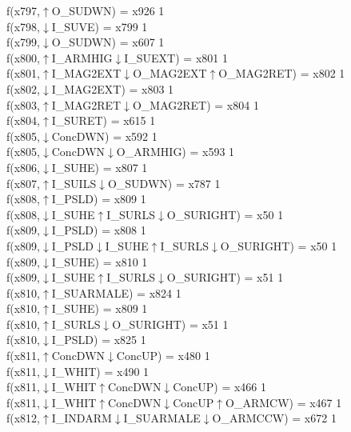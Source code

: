 f(x797,$\uparrow$O\_SUDWN) = x926 {1} \\
f(x798,$\downarrow$I\_SUVE) = x799 {1} \\
f(x799,$\downarrow$O\_SUDWN) = x607 {1} \\
f(x800,$\uparrow$I\_ARMHIG$\downarrow$I\_SUEXT) = x801 {1} \\
f(x801,$\uparrow$I\_MAG2EXT$\downarrow$O\_MAG2EXT$\uparrow$O\_MAG2RET) = x802 {1} \\
f(x802,$\downarrow$I\_MAG2EXT) = x803 {1} \\
f(x803,$\uparrow$I\_MAG2RET$\downarrow$O\_MAG2RET) = x804 {1} \\
f(x804,$\uparrow$I\_SURET) = x615 {1} \\
f(x805,$\downarrow$ConcDWN) = x592 {1} \\
f(x805,$\downarrow$ConcDWN$\downarrow$O\_ARMHIG) = x593 {1} \\
f(x806,$\downarrow$I\_SUHE) = x807 {1} \\
f(x807,$\uparrow$I\_SUILS$\downarrow$O\_SUDWN) = x787 {1} \\
f(x808,$\uparrow$I\_PSLD) = x809 {1} \\
f(x808,$\downarrow$I\_SUHE$\uparrow$I\_SURLS$\downarrow$O\_SURIGHT) = x50 {1} \\
f(x809,$\downarrow$I\_PSLD) = x808 {1} \\
f(x809,$\downarrow$I\_PSLD$\downarrow$I\_SUHE$\uparrow$I\_SURLS$\downarrow$O\_SURIGHT) = x50 {1} \\
f(x809,$\downarrow$I\_SUHE) = x810 {1} \\
f(x809,$\downarrow$I\_SUHE$\uparrow$I\_SURLS$\downarrow$O\_SURIGHT) = x51 {1} \\
f(x810,$\uparrow$I\_SUARMALE) = x824 {1} \\
f(x810,$\uparrow$I\_SUHE) = x809 {1} \\
f(x810,$\uparrow$I\_SURLS$\downarrow$O\_SURIGHT) = x51 {1} \\
f(x810,$\downarrow$I\_PSLD) = x825 {1} \\
f(x811,$\uparrow$ConcDWN$\downarrow$ConcUP) = x480 {1} \\
f(x811,$\downarrow$I\_WHIT) = x490 {1} \\
f(x811,$\downarrow$I\_WHIT$\uparrow$ConcDWN$\downarrow$ConcUP) = x466 {1} \\
f(x811,$\downarrow$I\_WHIT$\uparrow$ConcDWN$\downarrow$ConcUP$\uparrow$O\_ARMCW) = x467 {1} \\
f(x812,$\uparrow$I\_INDARM$\downarrow$I\_SUARMALE$\downarrow$O\_ARMCCW) = x672 {1} \\
